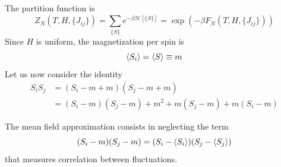 \documentclass[../../Main/Main.tex]{subfiles}
\begin{document}
The partition function is
\begin{equation}
  Z_N (T,H,\{ J_{ij} \}  )= \sum_{\{ S \}  }^{} e^{-\beta   \mathcal{H} [\{ S \}] } = \exp (-\beta F_N (T,H,\{ J_{ij} \}  ))
\end{equation}
Since \( H \) is uniform, the magnetization per spin is
\begin{equation*}
  \expval{S_i}  = \expval{S} \equiv m
\end{equation*}
Let us now consider the identity
\begin{equation*}
\begin{split}
  S_i S_j  &= (S_i - m + m) (S_j - m + m)  \\
  & = (S_i - m ) (S_j - m)  + m^2 + m (S_j-m) + m (S_i-m)
\end{split}
\end{equation*}

\begin{remark}
The mean field approximation consists in neglecting the term
\begin{equation*}
  (S_i - m ) (S_j - m) = (S_i - \expval{S_i})(S_j - \expval{S_j})
\end{equation*}
that measures correlation between fluctuations. 
\end{remark}
\end{document}

